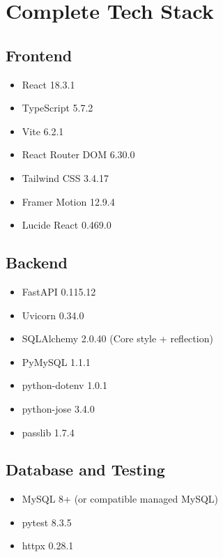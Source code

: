 \documentclass[11pt,a4paper]{article}
\begin{document}
\section{Complete Tech Stack}
\subsection{Frontend}
\begin{itemize}
  \item React 18.3.1
  \item TypeScript 5.7.2
  \item Vite 6.2.1
  \item React Router DOM 6.30.0
  \item Tailwind CSS 3.4.17
  \item Framer Motion 12.9.4
  \item Lucide React 0.469.0
\end{itemize}

\subsection{Backend}
\begin{itemize}
  \item FastAPI 0.115.12
  \item Uvicorn 0.34.0
  \item SQLAlchemy 2.0.40 (Core style + reflection)
  \item PyMySQL 1.1.1
  \item python-dotenv 1.0.1
  \item python-jose 3.4.0
  \item passlib 1.7.4
\end{itemize}

\subsection{Database and Testing}
\begin{itemize}
  \item MySQL 8+ (or compatible managed MySQL)
  \item pytest 8.3.5
  \item httpx 0.28.1
\end{itemize}
\end{document}
